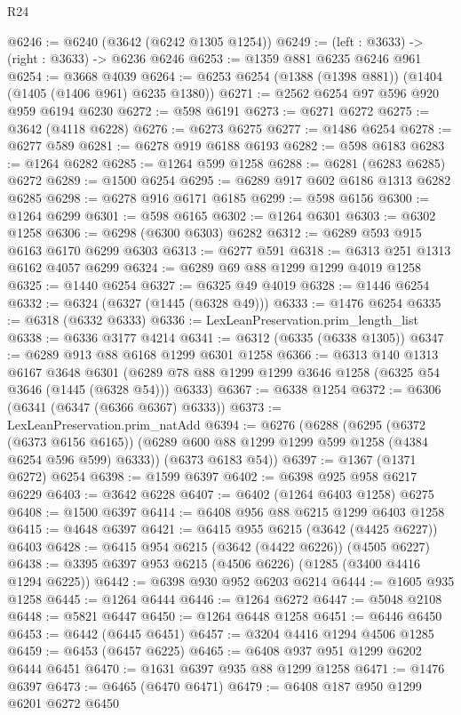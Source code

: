 \begin{lexlean}{R24}
\begin{coremodule}
@6246 := @6240 (@3642 (@6242 @1305 @1254))
@6249 := (left : @3633) -> (right : @3633) -> @6236 @6246
@6253 := @1359 @881 @6235 @6246 @961
@6254 := @3668 @4039
@6264 := @6253 @6254 (@1388 (@1398 @881)) (@1404 (@1405 (@1406 @961) @6235 @1380))
@6271 := @2562 @6254 @97 @596 @920 @959 @6194 @6230
@6272 := @598 @6191
@6273 := @6271 @6272
@6275 := @3642 (@4118 @6228)
@6276 := @6273 @6275
@6277 := @1486 @6254
@6278 := @6277 @589
@6281 := @6278 @919 @6188 @6193
@6282 := @598 @6183
@6283 := @1264 @6282
@6285 := @1264 @599 @1258
@6288 := @6281 (@6283 @6285) @6272
@6289 := @1500 @6254
@6295 := @6289 @917 @602 @6186 @1313 @6282 @6285
@6298 := @6278 @916 @6171 @6185
@6299 := @598 @6156
@6300 := @1264 @6299
@6301 := @598 @6165
@6302 := @1264 @6301
@6303 := @6302 @1258
@6306 := @6298 (@6300 @6303) @6282
@6312 := @6289 @593 @915 @6163 @6170 @6299 @6303
@6313 := @6277 @591
@6318 := @6313 @251 @1313 @6162 @4057 @6299
@6324 := @6289 @69 @88 @1299 @1299 @4019 @1258
@6325 := @1440 @6254
@6327 := @6325 @49 @4019
@6328 := @1446 @6254
@6332 := @6324 (@6327 (@1445 (@6328 @49)))
@6333 := @1476 @6254
@6335 := @6318 (@6332 @6333)
@6336 := LexLeanPreservation.prim_length_list
@6338 := @6336 @3177 @4214
@6341 := @6312 (@6335 (@6338 @1305))
@6347 := @6289 @913 @88 @6168 @1299 @6301 @1258
@6366 := @6313
    @140
    @1313
    @6167
    @3648
    @6301
    (@6289 @78 @88 @1299 @1299 @3646 @1258 (@6325 @54 @3646 (@1445 (@6328 @54))) @6333)
@6367 := @6338 @1254
@6372 := @6306 (@6341 (@6347 (@6366 @6367) @6333))
@6373 := LexLeanPreservation.prim_natAdd
@6394 := @6276
    (@6288
      (@6295
        (@6372 (@6373 @6156 @6165))
        (@6289 @600 @88 @1299 @1299 @599 @1258 (@4384 @6254 @596 @599) @6333))
      (@6373 @6183 @54))
@6397 := @1367 (@1371 @6272) @6254
@6398 := @1599 @6397
@6402 := @6398 @925 @958 @6217 @6229
@6403 := @3642 @6228
@6407 := @6402 (@1264 @6403 @1258) @6275
@6408 := @1500 @6397
@6414 := @6408 @956 @88 @6215 @1299 @6403 @1258
@6415 := @4648 @6397
@6421 := @6415 @955 @6215 (@3642 (@4425 @6227)) @6403
@6428 := @6415 @954 @6215 (@3642 (@4422 @6226)) (@4505 @6227)
@6438 := @3395 @6397 @953 @6215 (@4506 @6226) (@1285 (@3400 @4416 @1294 @6225))
@6442 := @6398 @930 @952 @6203 @6214
@6444 := @1605 @935 @1258
@6445 := @1264 @6444
@6446 := @1264 @6272
@6447 := @5048 @2108
@6448 := @5821 @6447
@6450 := @1264 @6448 @1258
@6451 := @6446 @6450
@6453 := @6442 (@6445 @6451)
@6457 := @3204 @4416 @1294 @4506 @1285
@6459 := @6453 (@6457 @6225)
@6465 := @6408 @937 @951 @1299 @6202 @6444 @6451
@6470 := @1631 @6397 @935 @88 @1299 @1258
@6471 := @1476 @6397
@6473 := @6465 (@6470 @6471)
@6479 := @6408 @187 @950 @1299 @6201 @6272 @6450

\end{coremodule}
\end{lexlean}
